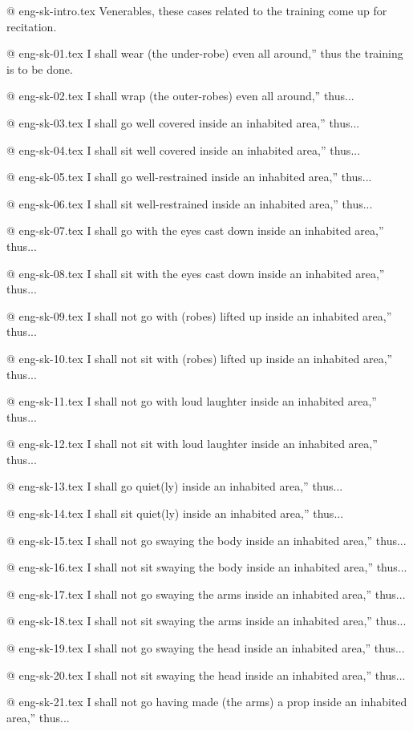 @ eng-sk-intro.tex
Venerables, these cases related to the training come up for recitation.

@ eng-sk-01.tex
I shall wear (the under-robe) even all around,” thus the training is to be done.

@ eng-sk-02.tex
I shall wrap (the outer-robes) even all around,” thus...

@ eng-sk-03.tex
I shall go well covered inside an inhabited area,” thus...

@ eng-sk-04.tex
I shall sit well covered inside an inhabited area,” thus...

@ eng-sk-05.tex
I shall go well-restrained inside an inhabited area,” thus...

@ eng-sk-06.tex
I shall sit well-restrained inside an inhabited area,” thus...

@ eng-sk-07.tex
I shall go with the eyes cast down inside an inhabited area,” thus...

@ eng-sk-08.tex
I shall sit with the eyes cast down inside an inhabited area,” thus...

@ eng-sk-09.tex
I shall not go with (robes) lifted up inside an inhabited area,” thus...

@ eng-sk-10.tex
I shall not sit with (robes) lifted up inside an inhabited area,” thus...

@ eng-sk-11.tex
I shall not go with loud laughter inside an inhabited area,” thus...

@ eng-sk-12.tex
I shall not sit with loud laughter inside an inhabited area,” thus...

@ eng-sk-13.tex
I shall go quiet(ly) inside an inhabited area,” thus...

@ eng-sk-14.tex
I shall sit quiet(ly) inside an inhabited area,” thus...

@ eng-sk-15.tex
I shall not go swaying the body inside an inhabited area,” thus...

@ eng-sk-16.tex
I shall not sit swaying the body inside an inhabited area,” thus...

@ eng-sk-17.tex
I shall not go swaying the arms inside an inhabited area,” thus...

@ eng-sk-18.tex
I shall not sit swaying the arms inside an inhabited area,” thus...

@ eng-sk-19.tex
I shall not go swaying the head inside an inhabited area,” thus...

@ eng-sk-20.tex
I shall not sit swaying the head inside an inhabited area,” thus...

@ eng-sk-21.tex
I shall not go having made (the arms) a prop inside an inhabited area,” thus...

